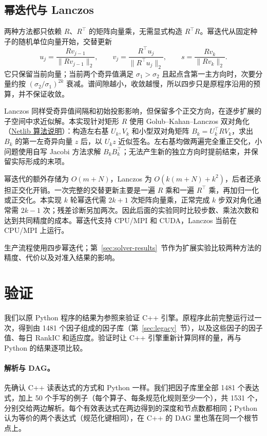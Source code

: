 \documentclass[11pt,a4paper,UTF8,fontset=fandol]{ctexart}
\begin{document}
\subsection{幂迭代与 Lanczos}
\label{sec:pca-solvers}
两种方法都只依赖 $R$、$R^\top$ 的矩阵向量乘，无需显式构造 $R^\top R$。幂迭代从固定种子的随机单位向量开始，交替更新
\begin{equation}
 u_j=\frac{Rv_{j-1}}{\|Rv_{j-1}\|_2},\qquad
 v_j=\frac{R^\top u_j}{\|R^\top u_j\|_2},\qquad
 s=\frac{Rv_k}{\|Rv_k\|_2}.
 \label{eq:power}
\end{equation}
它只保留当前向量；当前两个奇异值满足 $\sigma_1>\sigma_2$ 且起点含第一主方向时，次要分量约按 $(\sigma_2/\sigma_1)^{2k}$ 衰减。谱间隙越小，收敛越慢，所以四步只是原程序沿用的预算，并不保证收敛。

Lanczos 同样受奇异值间隔和初始投影影响，但保留多个正交方向，在逐步扩展的子空间中求近似解。本实现针对矩形 $R$ 使用 Golub--Kahan--Lanczos 双对角化（\href{https://netlib.org/utk/people/JackDongarra/etemplates/node197.html}{Netlib 算法说明}）：构造左右基 $U_k,V_k$ 和小型双对角矩阵 $B_k=U_k^\top RV_k$，求出 $B_k$ 的第一左奇异向量 $z$ 后，以 $U_kz$ 近似签名。左右基均做两遍完全重正交化，小问题使用自写 Jacobi 方法求解 $B_kB_k^\top$；无法产生新的独立方向时提前结束，并保留实际形成的末项。

幂迭代的额外存储为 $O(m+N)$，Lanczos 为 $O(k(m+N)+k^2)$，后者还承担正交化开销。一次完整的交替更新主要是一遍 $R$ 乘和一遍 $R^\top$ 乘，再加归一化或正交化。本实现 $k$ 轮幂迭代需 $2k+1$ 次矩阵向量乘，正常完成 $k$ 步双对角化通常需 $2k-1$ 次；残差诊断另加两次。因此后面的实验同时比较步数、乘法次数和达到共同精度的成本。幂迭代支持 CPU/MPI 和 CUDA，Lanczos 当前在 CPU/MPI 上运行。



生产流程使用四步幂迭代；第~\ref{sec:solver-results}~节作为扩展实验比较两种方法的精度、代价以及对准入结果的影响。

\section{验证}
\label{sec:validation}
我们以原 Python 程序的结果为参照来验证 C++ 引擎。原程序此前完整运行过一次，得到由 1481 个因子组成的因子库（第~\ref{sec:legacy}~节），以及这些因子的因子值、每日 RankIC 和适应度。验证时让 C++ 引擎重新计算同样的量，再与 Python 的结果逐项比较。

\paragraph{解析与 DAG。}先确认 C++ 读表达式的方式和 Python 一样。我们把因子库里全部 1481 个表达式，加上 50 个手写的例子（每个算子、每条规范化规则至少一个），共 1531 个，分别交给两边解析。每个有效表达式在两边得到的深度和节点数都相同；Python 认为等价的两个表达式（规范化键相同），在 C++ 的 DAG 里也落在同一个根节点上。
\end{document}
